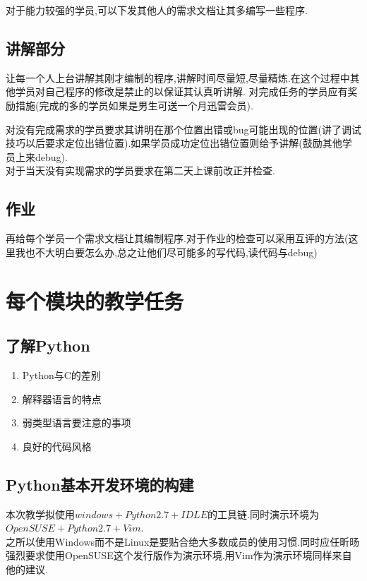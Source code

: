 \documentclass[12pt,a4paper]{article}
\begin{document}
对于能力较强的学员,可以下发其他人的需求文档让其多编写一些程序.

\subsection{讲解部分}

让每一个人上台讲解其刚才编制的程序,讲解时间尽量短,尽量精炼.在这个过程中其他学员对自己程序的修改是禁止的以保证其认真听讲解.
对完成任务的学员应有奖励措施(完成的多的学员如果是男生可送一个月迅雷会员).

对没有完成需求的学员要求其讲明在那个位置出错或bug可能出现的位置(讲了调试技巧以后要求定位出错位置).如果学员成功定位出错位置则给予讲解(鼓励其他学员上来debug).\\

对于当天没有实现需求的学员要求在第二天上课前改正并检查.

\subsection{作业}

再给每个学员一个需求文档让其编制程序.对于作业的检查可以采用互评的方法(这里我也不大明白要怎么办,总之让他们尽可能多的写代码,读代码与debug)

\section{每个模块的教学任务}

\subsection{了解Python}
\begin{enumerate}
\item Python与C的差别
\item 解释器语言的特点
\item 弱类型语言要注意的事项
\item 良好的代码风格

\end{enumerate}

\subsection{Python基本开发环境的构建}
本次教学拟使用$windows+Python2.7+IDLE$的工具链.同时演示环境为$OpenSUSE+Python2.7+Vim$.\\

之所以使用Windows而不是Linux是要贴合绝大多数成员的使用习惯.同时应任昕旸强烈要求使用OpenSUSE这个发行版作为演示环境.用Vim作为演示环境同样来自他的建议.\\
\end{document}
